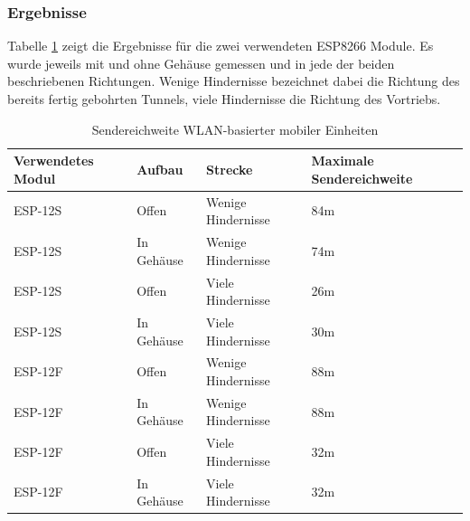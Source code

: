 \subsubsection{Ergebnisse}
Tabelle \ref{table:rangewifi} zeigt die Ergebnisse für die zwei verwendeten ESP8266 Module.
Es wurde jeweils mit und ohne Gehäuse gemessen und in jede der beiden beschriebenen Richtungen.
Wenige Hindernisse bezeichnet dabei die Richtung des bereits fertig gebohrten Tunnels, viele Hindernisse die Richtung des Vortriebs.

\begin{table}[h]
	\centering
	\caption{Sendereichweite WLAN-basierter mobiler Einheiten}
	\label{table:rangewifi}
	\begin{tabular}{p{3.5cm}|p{3cm}|p{3.5cm}|p{3cm}}
		Verwendetes Modul & Aufbau & Strecke & Maximale Sendereichweite \\
		\hline
		ESP-12S & Offen & Wenige Hindernisse & 84m \\
		ESP-12S & In Gehäuse & Wenige Hindernisse & 74m \\
		ESP-12S & Offen & Viele Hindernisse & 26m \\
		ESP-12S & In Gehäuse & Viele Hindernisse & 30m \\
		\hline
		ESP-12F & Offen & Wenige Hindernisse & 88m \\
		ESP-12F & In Gehäuse & Wenige Hindernisse & 88m \\
		ESP-12F & Offen & Viele Hindernisse & 32m \\
		ESP-12F & In Gehäuse & Viele Hindernisse & 32m \\
	\end{tabular}
\end{table}


